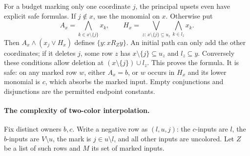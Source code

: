 For a budget marking only one coordinate $j$, the principal upsets even
have explicit safe formulas. If $j\notin x$, use the monomial on $x$.
Otherwise put
\[
 A_x=\bigwedge_{k\in x\setminus\{j\}}x_k,\qquad
 H_x=\bigvee_{z:\,x\setminus\{j\}\subseteq u_z}
             \bigwedge_{k\in l_z}x_k.
\]
Then $A_x\wedge(x_j\vee H_x)$ defines $\{y:xR_Zy\}$.
An initial path can only add the other coordinates; if it deletes $j$,
some row $z$ has $x\setminus\{j\}\subseteq u_z$ and $l_z\subseteq y$.
Conversely these conditions allow deletion at
$(x\setminus\{j\})\cup l_z$. This proves the formula.
It is safe: on any marked row $w$, either $A_x=b$, or $w$ occurs in
$H_x$ and its lower monomial is $c$, which absorbs the marked input.
Empty conjunctions and disjunctions are the permitted endpoint constants.

\paragraph{The complexity of two-color interpolation.}
Fix distinct owners $b,c$. Write a negative row as $(l,u,j)$: the
$c$-inputs are $l$, the $b$-inputs are $V\setminus u$, the mark is
$j\in u\setminus l$, and all other inputs are uncolored. Let $Z$ be a
list of such rows and $M$ its set of marked inputs.

